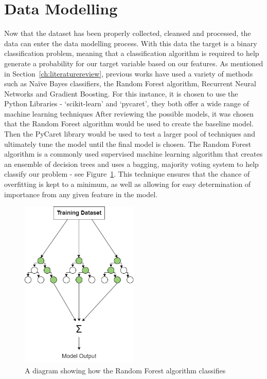 \section{Data Modelling}\label{sec:Data Modelling}
Now that the dataset has been properly collected, cleansed and processed, the data can enter the data modelling process.
With this data the target is a binary classification problem, meaning that a classification algorithm is required to help generate a probability for our target variable based on our features.
As mentioned in Section~\ref{ch:literaturereview}, previous works have used a variety of methods such as Naïve Bayes classifiers, the Random Forest algorithm, Recurrent Neural Networks and Gradient Boosting.
For this instance, it is chosen to use the Python Libraries - `scikit-learn' and `pycaret', they both offer a wide range of machine learning techniques
After reviewing the possible models, it was chosen that the Random Forest algorithm would be used to create the baseline model.
Then the PyCaret library would be used to test a larger pool of techniques and ultimately tune the model until the final model is chosen.
The Random Forest algorithm is a commonly used supervised machine learning algorithm that creates an ensemble of decision trees and uses a bagging, majority voting system to help classify our problem - see Figure~\ref{fig:RandomForest}.
This technique ensures that the chance of overfitting is kept to a minimum, as well as allowing for easy determination of importance from any given feature in the model.

\begin{figure}[h!]
    \centering
    \includegraphics[width=0.5\textwidth]{figures/RandomForest}
    \caption{A diagram showing how the Random Forest algorithm classifies}
    \label{fig:RandomForest}
\end{figure}

